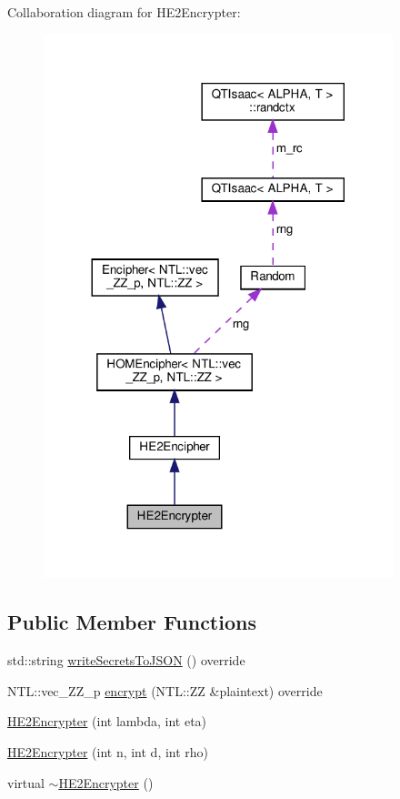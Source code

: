 Collaboration diagram for H\+E2\+Encrypter\+:\nopagebreak
\begin{figure}[H]
\begin{center}
\leavevmode
\includegraphics[width=288pt]{classHE2Encrypter__coll__graph}
\end{center}
\end{figure}
\subsection*{Public Member Functions}
\begin{DoxyCompactItemize}
\item 
std\+::string \hyperlink{classHE2Encrypter_a8cdf863bfbe046b4e57322adf5addddb}{write\+Secrets\+To\+J\+S\+ON} () override
\item 
N\+T\+L\+::vec\+\_\+\+Z\+Z\+\_\+p \hyperlink{classHE2Encrypter_a57e4bdacbab9b11467f26deab921d134}{encrypt} (N\+T\+L\+::\+ZZ \&plaintext) override
\item 
\hyperlink{classHE2Encrypter_afa15786431e27f582fb4b62282407ed4}{H\+E2\+Encrypter} (int lambda, int eta)
\item 
\hyperlink{classHE2Encrypter_a38f4e27834ca8d2f2169dd8618e66650}{H\+E2\+Encrypter} (int n, int d, int rho)
\item 
virtual \hyperlink{classHE2Encrypter_a22a4b92894ca930ee234c219d7d2038e}{$\sim$\+H\+E2\+Encrypter} ()
\end{DoxyCompactItemize}
